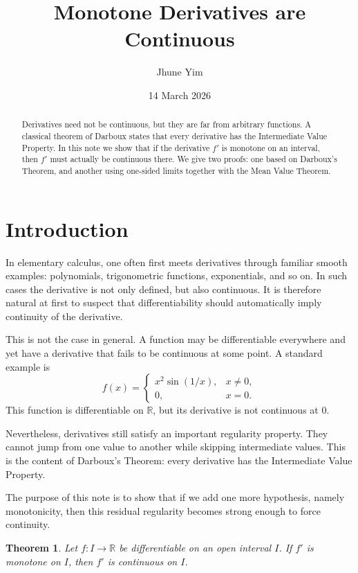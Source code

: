 \documentclass[11pt,a4paper]{amsart}
\title{Monotone Derivatives are Continuous}
\author{Jhune Yim}
\date{14 March 2026}
\newtheorem{theorem}{Theorem}
\theoremstyle{remark}
\begin{document}
\maketitle

\begin{abstract}
Derivatives need not be continuous, but they are far from arbitrary functions.
A classical theorem of Darboux states that every derivative has the Intermediate Value Property.
In this note we show that if the derivative $f'$ is monotone on an interval, then $f'$ must actually be continuous there.
We give two proofs: one based on Darboux's Theorem, and another using one-sided limits together with the Mean Value Theorem.
\end{abstract}

\section{Introduction}

In elementary calculus, one often first meets derivatives through familiar smooth examples:
polynomials, trigonometric functions, exponentials, and so on.
In such cases the derivative is not only defined, but also continuous.
It is therefore natural at first to suspect that differentiability should automatically imply continuity of the derivative.

This is not the case in general.
A function may be differentiable everywhere and yet have a derivative that fails to be continuous at some point.
A standard example is
\[
f(x)=
\begin{cases}
x^2\sin(1/x), & x\neq 0,\\
0, & x=0.
\end{cases}
\]
This function is differentiable on $\mathbb{R}$, but its derivative is not continuous at $0$.

Nevertheless, derivatives still satisfy an important regularity property.
They cannot jump from one value to another while skipping intermediate values.
This is the content of Darboux's Theorem: every derivative has the Intermediate Value Property.

The purpose of this note is to show that if we add one more hypothesis, namely monotonicity, then this residual regularity becomes strong enough to force continuity.

\begin{theorem}\label{thm:main}
Let $f:I\to\mathbb{R}$ be differentiable on an open interval $I$.
If $f'$ is monotone on $I$, then $f'$ is continuous on $I$.
\end{theorem}
\end{document}
